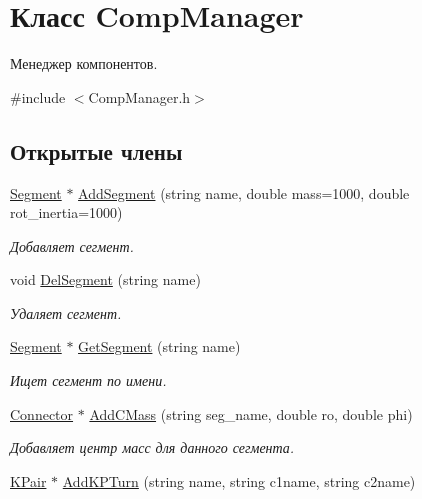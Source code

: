 \hypertarget{class_comp_manager}{
\section{Класс CompManager}
\label{class_comp_manager}
}


Менеджер компонентов.  




{\ttfamily \#include $<$CompManager.h$>$}

\subsection*{Открытые члены}
\begin{DoxyCompactItemize}
\item 
\hyperlink{class_segment}{Segment} $\ast$ \hyperlink{class_comp_manager_a7ecbf9a15c3fc964ab7d6ab4024f25ac}{AddSegment} (string name, double mass=1000, double rot\_\-inertia=1000)
\begin{DoxyCompactList}\small\item\em Добавляет сегмент. \item\end{DoxyCompactList}\item 
void \hyperlink{class_comp_manager_ab8b0643ca8728557894ab34f47e47ae9}{DelSegment} (string name)
\begin{DoxyCompactList}\small\item\em Удаляет сегмент. \item\end{DoxyCompactList}\item 
\hyperlink{class_segment}{Segment} $\ast$ \hyperlink{class_comp_manager_a27e3139830fad4ef9585d614cafadfe4}{GetSegment} (string name)
\begin{DoxyCompactList}\small\item\em Ищет сегмент по имени. \item\end{DoxyCompactList}\item 
\hyperlink{struct_connector}{Connector} $\ast$ \hyperlink{class_comp_manager_a912b25c0acff2591015e958bedd1d159}{AddCMass} (string seg\_\-name, double ro, double phi)
\begin{DoxyCompactList}\small\item\em Добавляет центр масс для данного сегмента. \item\end{DoxyCompactList}\item 
\hyperlink{class_k_pair}{KPair} $\ast$ \hyperlink{class_comp_manager_ad772ce1d11dc2e636f02cf9b56cf90fb}{AddKPTurn} (string name, string c1name, string c2name)

\end{DoxyCompactItemize}
